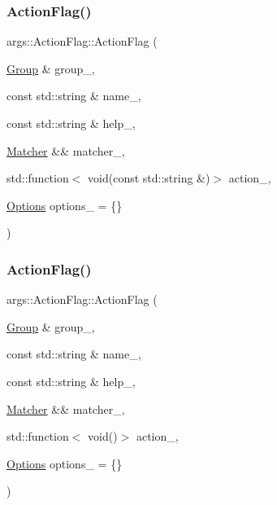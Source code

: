 \subsubsection{\texorpdfstring{Action\+Flag()}{ActionFlag()}\hspace{0.1cm}{\footnotesize\ttfamily [2/3]}}
{\footnotesize\ttfamily args\+::\+Action\+Flag\+::\+Action\+Flag (\begin{DoxyParamCaption}\item[{\hyperlink{classargs_1_1_group}{Group} \&}]{group\+\_\+,  }\item[{const std\+::string \&}]{name\+\_\+,  }\item[{const std\+::string \&}]{help\+\_\+,  }\item[{\hyperlink{classargs_1_1_matcher}{Matcher} \&\&}]{matcher\+\_\+,  }\item[{std\+::function$<$ void(const std\+::string \&)$>$}]{action\+\_\+,  }\item[{\hyperlink{namespaceargs_aa530c0f95194aa275f49a5f299ac9e77}{Options}}]{options\+\_\+ = {\ttfamily \{\}} }\end{DoxyParamCaption})\hspace{0.3cm}{\ttfamily [inline]}}

\mbox{\label{classargs_1_1_action_flag_a811e7632dface8147a93ac5d19a1bd34}} 
\subsubsection{\texorpdfstring{Action\+Flag()}{ActionFlag()}\hspace{0.1cm}{\footnotesize\ttfamily [3/3]}}
{\footnotesize\ttfamily args\+::\+Action\+Flag\+::\+Action\+Flag (\begin{DoxyParamCaption}\item[{\hyperlink{classargs_1_1_group}{Group} \&}]{group\+\_\+,  }\item[{const std\+::string \&}]{name\+\_\+,  }\item[{const std\+::string \&}]{help\+\_\+,  }\item[{\hyperlink{classargs_1_1_matcher}{Matcher} \&\&}]{matcher\+\_\+,  }\item[{std\+::function$<$ void()$>$}]{action\+\_\+,  }\item[{\hyperlink{namespaceargs_aa530c0f95194aa275f49a5f299ac9e77}{Options}}]{options\+\_\+ = {\ttfamily \{\}} }\end{DoxyParamCaption})\hspace{0.3cm}{\ttfamily [inline]}}



